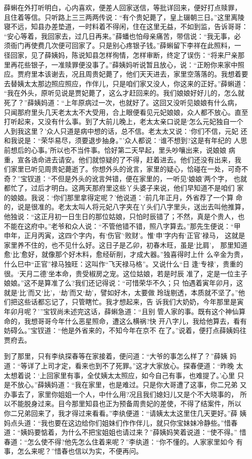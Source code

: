薛蝌在外打听明白，心内喜欢，便差人回家送信，等批详回来，便好打点赎罪，
且住着等信。只听路上三三两两传说：“有个贵妃薨了，皇上辍朝三日。”这里离陵
寝不远，知县办差垫道，一时料着不得闲，住在这里无益，不如到监，告诉哥哥：
“安心等着，我回家去，过几日再来。”薛蟠也怕母亲痛苦，带信说：“我无事，必
须衙门再使费几次便可回家了。只是别心疼银子钱。”薛蝌留下李祥在此照料，一
径回家，见了薛姨妈，陈说知县怎样徇情，怎样审断，终定了误伤：“将来尸亲那
里再花些银子，一准赎罪便没事了。”薛姨妈听说暂且放心，说：“正盼你来家中照
应。贾府里本该谢去，况且周贵妃薨了，他们天天进去，家里空落落的。我想着要
去替姨太太那边照应照应，作伴儿，只是咱们家又没人，你这来的正好。”薛蝌道：
“我在外头，原听见说是贾妃薨了，这么才赶回来的。我们娘娘好好儿的，怎么就
死了？”薛姨妈道：“上年原病过一次，也就好了。这回又没听见娘娘有什么病，
只闻那府里头几天老太太不大受用，合上眼便看见元妃娘娘，众人都不放心。直至
打听起来，又没有什么事。到了大前儿晚上，老太太亲口说是‘怎么元妃独自一个
人到我这里？’众人只道是病中想的话，总不信。老太太又说：‘你们不信，元妃
还和我说是：“荣华易尽，须要退步抽身。”’众人都说：‘谁不想到?这是有年纪的
人思前想后的心事。’所以也不当件事。恰好第二天早起，里头吵嚷出来，说娘娘
病重，宣各诰命进去请安。他们就惊疑的了不得，赶着进去。他们还没有出来，我
们家里已听见周贵妃薨逝了。你想外头的讹言，家里的疑心，恰碰在一处，可奇不
奇？”宝钗道：“不但是外头的讹言舛错，便在家里的，一听见‘娘娘’两个字，
也就都忙了，过后才明白。这两天那府里这些丫头婆子来说，他们早知道不是咱们
家的娘娘。我说：‘你们那里拿得定呢？’他说道：‘前几年正月，外省荐了一个算
命的，说是很准的。老太太叫人将元妃八字夹在丫头们八字里头，送出去叫他推算，
他独说：“这正月初一日生日的那位姑娘，只怕时辰错了；不然，真是个贵人，也
不能在这府中。”老爷和众人说：“不管他错不错，照八字算去。”那先生便说：“甲
申年，正月丙寅，这四个字内，有‘伤官’‘败财’。惟‘申’字内有‘正官’禄马，
这就是家里养不住的，也不见什么好。这日子是乙卯，初春木旺，虽是‘比肩’，
那里知道愈‘比’愈好，就像那个好木料，愈经斫削，才成大器。”独喜得时上什
么辛金为贵，什么巳中“正官”禄马独旺：这叫作“飞天禄马格”。又说什么“日
逢‘专禄’，贵重的很。‘天月二德’坐本命，贵受椒房之宠。这位姑娘，若是时辰
准了，定是一位主子娘娘。”这不是算准了么?我们还记得说：“可惜荣华不久；只
怕遇着寅年卯月，这就是‘比’而又‘比’，‘劫’而又‘劫’，譬如好木，太要做
玲珑剔透，本质就不坚了。”他们把这些话都忘记了，只管瞎忙。我才想起来，告
诉我们大奶奶，今年那里是寅年卯月呢？’”宝钗尚未述完这话，薛蝌急道：“且别
管人家的事。既有这个神仙算命的，我想哥哥今年什么恶星照命，遭这么横祸?快
开八字儿，我给他算去，看有妨碍么。”宝钗道：“他是外省来的，不知今年在京不
在了。”说着，便打点薛姨妈往贾府去。

到了那里，只有李纨探春等在家接着，便问道：“大爷的事怎么样了？”薛姨
妈道：“等详了上司才定，看来也到不了死罪。”这才大家放心。探春便道：“昨晚
太太想着说：‘上回家里有事，全仗姨太太照应，如今自己有事，也难提了。’心里
只是不放心。”薛姨妈道：“我在家里，也是难过。只是你大哥遭了这事，你二兄弟
又办事去了，家里你姐姐一个人，中什么用?况且我们媳妇儿又是个不大晓事的，
所以不能脱身过来。目今那里知县也正为预备周贵妃的差使，不得了结案件，所以
你二兄弟回来了，我才得过来看看。”李纨便道：“请姨太太这里住几天更好。”薛
姨妈点头道：“我也要在这边给你们姐妹们作作伴儿，就只你宝妹妹冷静些。”惜春
道：“姨妈要惦着，为什么不把宝姐姐也请过来？”薛姨妈笑着说道：“使不得。”
惜春道：“怎么使不得?他先怎么住着来呢？”李纨道：“你不懂的。人家家里如今
有事，怎么来呢？”惜春也信以为实，不便再问。

